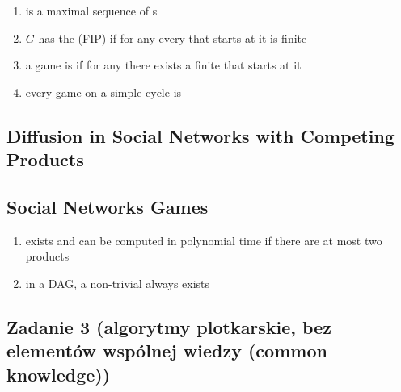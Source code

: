 \begin{enumerate}
  \item
    is a maximal sequence of
    s
  \item
    $G$ has the
    (FIP) if for any
    every
    that starts at it is finite

  \item
    a game is
    if for any
    there exists a finite
    that starts at it

  \item
    every game on a simple cycle is



\end{enumerate}

\subsection{Diffusion in Social Networks with Competing Products}

\subsection{Social Networks Games}

\begin{enumerate}
  \item
    exists and can be computed in polynomial time if there are at most two products
  \item
    in a DAG, a non-trivial
    always exists
\end{enumerate}

\subsection{Zadanie 3 (algorytmy plotkarskie, bez elementów wspólnej wiedzy (common knowledge))}

